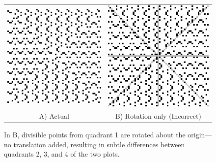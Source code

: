 \documentclass{article}
\begin{document}
\begin{figure}[h!]
	\centering
	\begin{tabular}{cc}
		\includegraphics[scale=0.5]{rotation1} & \includegraphics[scale=0.5]{rotation2} \\
		A) Actual & B) Rotation only (Incorrect)
	\end{tabular}
	\caption{In B, divisible points from quadrant 1 are rotated about the origin---no translation added, resulting in subtle differences between quadrants 2, 3, and 4 of the two plots.}
	\label{rotation}
\end{figure}
\end{document}

